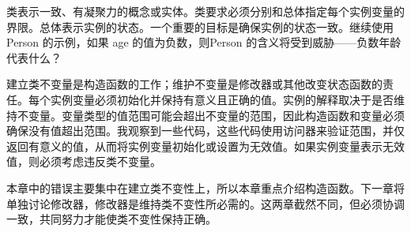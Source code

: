 
类表示一致、有凝聚力的概念或实体。类要求必须分别和总体指定每个实例变量的界限。总体表示实例的状态。一个重要的目标是确保实例的状态一致。继续使用 Person 的示例，如果 age 的值为负数，则Person 的含义将受到威胁——负数年龄代表什么？

建立类不变量是构造函数的工作；维护不变量是修改器或其他改变状态函数的责任。每个实例变量必须初始化并保持有意义且正确的值。实例的解释取决于是否维持不变量。变量类型的值范围可能会超出不变量的范围，因此构造函数和变量必须确保没有值超出范围。我观察到一些代码，这些代码使用访问器来验证范围，并仅返回有意义的值，从而将实例变量初始化或设置为无效值。如果实例变量表示无效值，则必须考虑违反类不变量。

本章中的错误主要集中在建立类不变性上，所以本章重点介绍构造函数。下一章将单独讨论修改器，修改器是维持类不变性所必需的。这两章截然不同，但必须协调一致，共同努力才能使类不变性保持正确。

